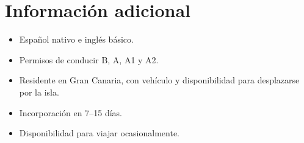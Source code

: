 \documentclass[11pt,a4paper]{article}
\begin{document}
\section*{Información adicional}
\begin{itemize}
  \item Español nativo e inglés básico.
  \item Permisos de conducir B, A, A1 y A2.
  \item Residente en Gran Canaria, con vehículo y disponibilidad para desplazarse por la isla.
  \item Incorporación en 7--15 días.
  \item Disponibilidad para viajar ocasionalmente.
\end{itemize}
\end{document}
